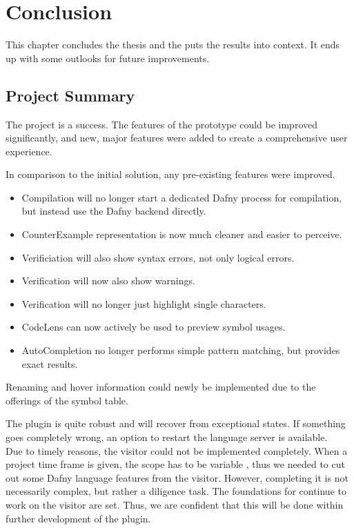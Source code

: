 \section{Conclusion}
\label{section:conclusion}
This chapter concludes the thesis and the puts the results into context.
It ends up with some outlooks for future improvements.

\subsection{Project Summary}
The project is a success.
The features of the prototype could be improved significantly, and new, major features were added to create a comprehensive user experience.

In comparison to the initial solution, any pre-existing features were improved.
\begin{itemize}
 \item Compilation will no longer start a dedicated Dafny process for compilation, but instead use the Dafny backend directly.
 \item CounterExample representation is now much cleaner and easier to perceive.
 \item Verificiation will also show syntax errors, not only logical errors.
 \item Verification will now also show warnings.
 \item Verification will no longer just highlight single characters.
 \item CodeLens can now actively be used to preview symbol usages.
 \item AutoCompletion no longer performs simple pattern matching, but provides exact results.
\end{itemize}
Renaming and hover information could newly be implemented due to the offerings of the symbol table.

The plugin is quite robust and will recover from exceptional states.
If something goes completely wrong, an option to restart the language server is available.\\

Due to timely reasons, the visitor could not be implemented completely.
When a project time frame is given, the scope has to be variable \cite{keller},
thus we needed to cut out some Dafny language features from the visitor.
However, completing it is not necessarily complex, but rather a diligence task.
The foundations for continue to work on the visitor are set.
Thus, we are confident that this will be done within further development of the plugin.\\


